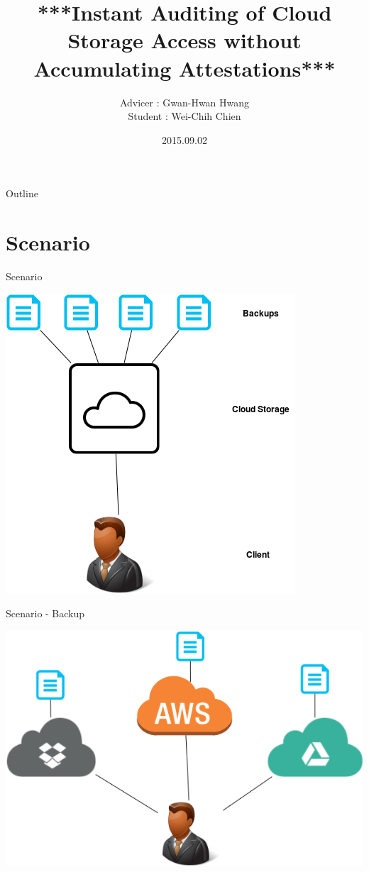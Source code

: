 \documentclass{beamer}
\title[Progress Report]{***Instant Auditing of Cloud Storage Access without Accumulating Attestations***}
\author[Wei-Chih Chien]{Advicer : Gwan-Hwan Hwang\\ Student : Wei-Chih Chien}
\institute[NTNU CSIE CCLAB]{NTNU CSIE CCLAB}
\date{2015.09.02}
\begin{document}
\begin{frame}
  \titlepage
\end{frame}

\begin{frame}{Outline}
  \tableofcontents
\end{frame}

\section{Scenario}
\begin{frame}{Scenario}
	\begin{center}
	\includegraphics[width=.6\textwidth]{Scenario1.png}
	\end{center}
\end{frame}

\begin{frame}{Scenario - Backup}
	\begin{center}
	\includegraphics[width=.9\textwidth]{Scenario2.png}
	\end{center}
\end{frame}
\end{document}
